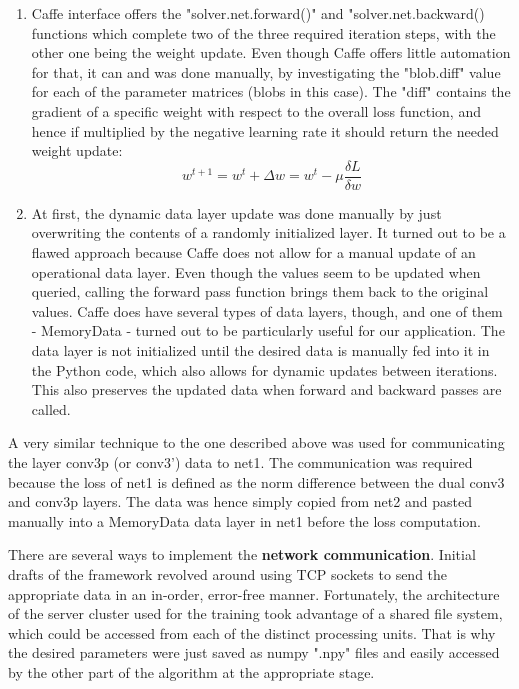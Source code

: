 \documentclass[a4paper, 12pt]{article}
\numberwithin{equation}{section}
\begin{document}
	\begin{enumerate}
		\item Caffe interface offers the "solver.net.forward()" and "solver.net.backward() functions which complete two of the three required iteration steps, with the other one being the weight update. Even though Caffe offers little automation for that, it can and was done manually, by investigating the "blob.diff" value for each of the parameter matrices (blobs in this case). The "diff" contains the gradient of a specific weight with respect to the overall loss function, and hence if multiplied by the negative learning rate it should return the needed weight update:
		\begin{equation}
		w^{t+1} = w^t + \Delta w = w^t - \mu \frac{\delta L}{\delta w}
		\end{equation}
		\item At first, the dynamic data layer update was done manually by just overwriting the contents of a randomly initialized layer.  It turned out to be a flawed approach because Caffe does not allow for a manual update of an operational data layer. Even though the values seem to be updated when queried, calling the forward pass function brings them back to the original values. Caffe does have several types of data layers, though, and one of them - MemoryData - turned out to be particularly useful for our application. The data layer is not initialized until the desired data is manually fed into it in the Python code, which also allows for dynamic updates between iterations. This also preserves the updated data when forward and backward passes are called.
	\end{enumerate}

	A very similar technique to the one described above was used for communicating the layer conv3p (or conv3') data to net1. The communication was required because the loss of net1 is defined as the norm difference between the dual conv3 and conv3p layers. The data was hence simply copied from net2 and pasted manually into a MemoryData data layer in net1 before the loss computation.

	There are several ways to implement the \textbf{network communication}. Initial drafts of the framework revolved around using TCP sockets to send the appropriate data in an in-order, error-free manner. Fortunately, the architecture of the server cluster used for the training took advantage of a shared file system, which could be accessed from each of the distinct processing units. That is why the desired parameters were just saved as numpy ".npy" files and easily accessed by the other part of the algorithm at the appropriate stage.
\end{document}
